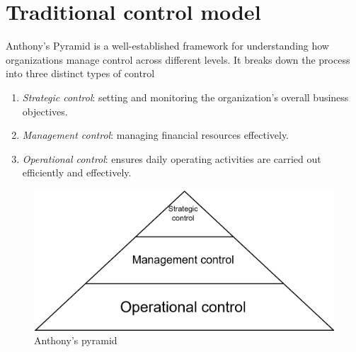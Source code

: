 \section{Traditional control model}

Anthony's Pyramid is a well-established framework for understanding how organizations manage control across different levels. It breaks down the process into three distinct types of control
\begin{enumerate}
    \item \textit{Strategic control}: setting and monitoring the organization's overall business objectives.
    \item \textit{Management control}: managing financial resources effectively. 
    \item \textit{Operational control}: ensures daily operating activities are carried out efficiently and effectively.
\end{enumerate}
\begin{figure}[H]
    \centering
    \includegraphics[width=0.5\linewidth]{images/bis3.png}
    \caption{Anthony's pyramid}
\end{figure}
